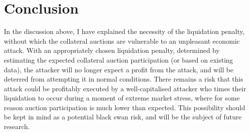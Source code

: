 \documentclass[a4paper,10pt]{article}
\begin{document}
\section{Conclusion}
\par In the discussion above, I have explained the necessity of the liquidation penalty, without which the collateral auctions are vulnerable to an unpleasant economic attack. With an appropriately chosen liquidation penalty, determined by estimating the expected collateral auction participation (or based on existing data), the attacker will no longer expect a profit from the attack, and will be deterred from attempting it in normal conditions. There remains a risk that this attack could be profitably executed by a well-capitalised attacker who times their liquidation to occur during a moment of extreme market stress, where for some reason auction participation is much lower than expected. This possibility should be kept in mind as a potential black swan risk, and will be the subject of future research.
\end{document}
